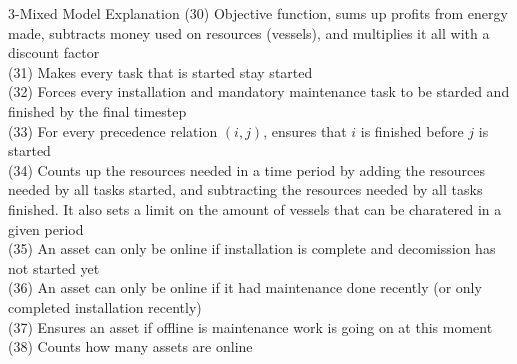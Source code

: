\documentclass{beamer}
\begin{document}
\begin{frame}{3-Mixed Model Explanation}
\small
(30) Objective function, sums up profits from energy made, subtracts money used on resources (vessels), and multiplies it all with a discount factor	\\
(31) Makes every task that is started stay started 	\\
(32) Forces every installation and mandatory maintenance task to be starded and finished by the final timestep	\\
(33) For every precedence relation $(i, j)$, ensures that $i$ is finished before $j$ is started 	\\
(34) Counts up the resources needed in a time period by adding the resources needed by all tasks started, and subtracting the resources needed by all tasks finished. It also sets a limit on the amount of vessels that can be charatered in a given period	\\
(35) An asset can only be online if installation is complete and decomission has not started yet \\
(36) An asset can only be online if it had maintenance done recently (or only completed installation recently) \\
(37) Ensures an asset if offline is maintenance work is going on at this moment \\
(38) Counts how many assets are online
\end{frame}
\end{document}
